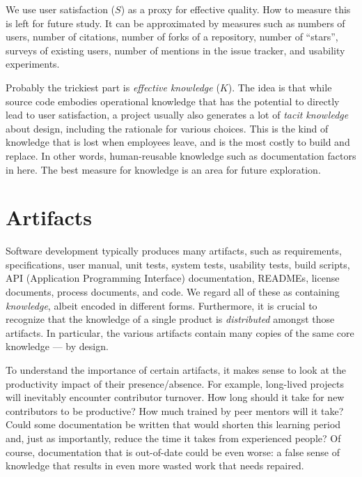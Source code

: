 \documentclass[sigconf, authorversion, nonacm]{acmart}
\begin{document}
We use user satisfaction ($S$) as a proxy for effective quality. How to 
measure this is left for future study. It can be approximated by measures
such as numbers of users, number of citations, number
of forks of a repository, number of ``stars'', surveys of existing users,
number of mentions in the issue tracker, and usability experiments.

Probably the trickiest part is \emph{effective knowledge} ($K$). The idea
is that while source code embodies operational knowledge that has the
potential to directly lead to user satisfaction, a project usually also
generates a lot of \emph{tacit knowledge} about design, including the
rationale for various choices. This is the kind of knowledge that is lost
when employees leave, and is the most costly to build and replace.
In other words, human-reusable knowledge such as documentation factors in
here.  The best measure for knowledge is an area for future exploration.

\section{Artifacts}

Software development typically produces many artifacts, such as
requirements, specifications, user manual, unit
tests, system tests, usability tests, build scripts, API (Application
Programming Interface) documentation, READMEs, license documents, process
documents, and code. We regard all of these as containing
\emph{knowledge}, albeit encoded in different forms. Furthermore, it is
crucial to recognize that the knowledge of a single product is 
\emph{distributed} amongst those artifacts. In particular, the various
artifacts contain many copies of the same core knowledge --- by design.

To understand the importance of certain artifacts, it makes sense to look
at the productivity impact of their presence/absence. For example,
long-lived projects will inevitably encounter contributor turnover. How long
should it take for new contributors to be productive? How much trained by
peer mentors will it take? Could some documentation be written that would
shorten this learning period and, just as importantly, reduce the time it
takes from experienced people? Of course, documentation that is out-of-date
could be even worse: a false sense of knowledge that results in even more
wasted work that needs repaired.
\end{document}
